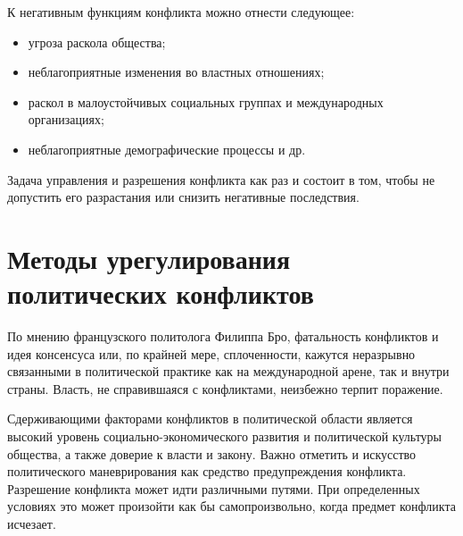 \documentclass[a4paper,12pt,notitlepage,pdftex,headsepline]{scrartcl}
\begin{document}
  К негативным функциям конфликта можно отнести следующее:
  \begin{itemize}
    \item угроза раскола общества;
    \item неблагоприятные изменения во властных отношениях;
    \item раскол в малоустойчивых социальных группах и международных
      организациях;
    \item неблагоприятные демографические процессы и др.
  \end{itemize}

  Задача управления и разрешения конфликта как раз и состоит в том, чтобы не
  допустить его разрастания или снизить негативные последствия.

  \clearpage
\section{Методы урегулирования политических конфликтов}
  По мнению французского политолога Филиппа Бро, фатальность конфликтов и идея
  консенсуса или, по крайней мере, сплоченности, кажутся неразрывно связанными
  в политической практике как на международной арене, так и внутри страны.
  Власть, не справившаяся с конфликтами, неизбежно терпит поражение.

  Сдерживающими факторами конфликтов в политической области является высокий
  уровень социально-экономического развития и политической культуры общества,
  а также доверие к власти и закону.
  Важно отметить и искусство политического маневрирования как средство
  предупреждения конфликта.
  Разрешение конфликта может идти различными путями.
  При определенных условиях это может произойти как бы самопроизвольно, когда
  предмет конфликта исчезает.
\end{document}
